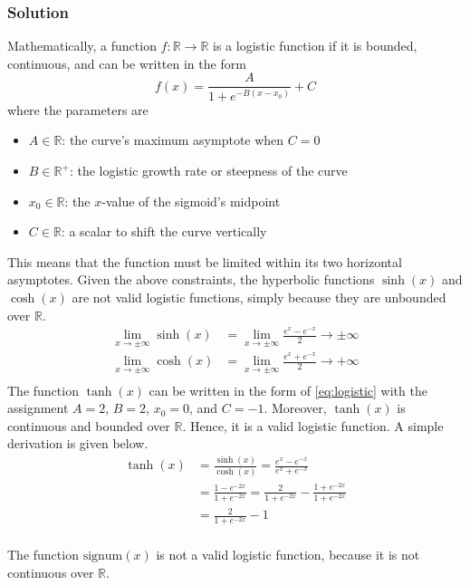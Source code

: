 \documentclass[12pt]{article}
\begin{document}
    \subsubsection*{Solution}
    Mathematically, a function $f: \mathbb{R} \to \mathbb{R}$ is a logistic function if it is bounded, continuous, and can be written
    in the form \begin{equation}
        \label{eq:logistic}
        f(x) = \frac{A}{1 + e^{-B(x - x_{0})}} + C
    \end{equation}
    where the parameters are
    \begin{itemize}[noitemsep]
        \item $A \in \mathbb{R}$: the curve's maximum asymptote when $C = 0$
        \item $B \in \mathbb{R}^{+}$: the logistic growth rate or steepness of the curve
        \item $x_{0} \in \mathbb{R}$: the $x$-value of the sigmoid's midpoint
        \item $C \in \mathbb{R}$: a scalar to shift the curve vertically
    \end{itemize}
    This means that the function must be limited within its two horizontal asymptotes.
    Given the above constraints, the hyperbolic functions $\sinh{(x)}$ and $\cosh{(x)}$ are not valid logistic functions,
    simply because they are unbounded over $\mathbb{R}$.
    \begin{align*}
        \lim_{x \to \pm \infty} \sinh{(x)} &= \lim_{x \to \pm \infty} \frac{e^{x} - e^{-x}}{2} \to \pm \infty \\
        \lim_{x \to \pm \infty} \cosh{(x)} &= \lim_{x \to \pm \infty} \frac{e^{x} + e^{-x}}{2} \to +\infty \\
    \end{align*}
    The function $\tanh{(x)}$ can be written in the form of \eqref{eq:logistic} with the assignment $A = 2$, $B = 2$,
    $x_{0} = 0$, and $C = -1$.  Moreover, $\tanh{(x)}$ is continuous and bounded over $\mathbb{R}$.
    Hence, it is a valid logistic function. A simple derivation is given below.
    \begin{align*}
        \tanh{(x)} &= \frac{\sinh{(x)}}{\cosh{(x)}} = \frac{e^{x} - e^{-x}}{e^{x} + e^{-x}} \\
        &= \frac{1 - e^{-2x}}{1 + e^{-2x}} = \frac{2}{1 + e^{-2x}} - \frac{1 + e^{-2x}}{1 + e^{-2x}} \\
        &= \frac{2}{1 + e^{-2x}} - 1
    \end{align*}
    \vspace*{5pt} \\
    The function $\text{signum}{(x)}$ is not a valid logistic function, because it is not continuous over $\mathbb{R}$.
\end{document}
